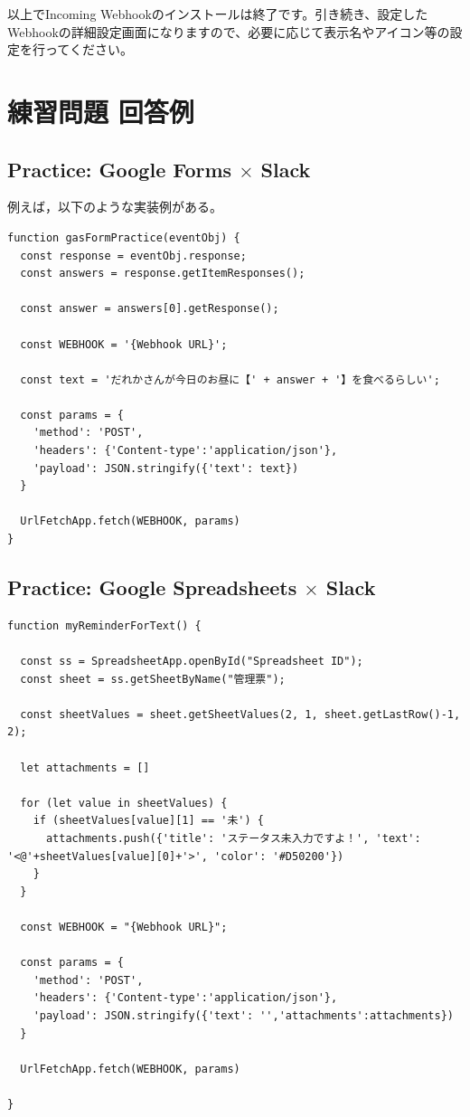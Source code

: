 \documentclass[uplatex,a4j]{jsarticle}
\begin{document}
以上でIncoming Webhookのインストールは終了です。引き続き、設定したWebhookの詳細設定画面になりますので、必要に応じて表示名やアイコン等の設定を行ってください。

\section{練習問題 回答例}

\subsection{Practice: Google Forms $\times$ Slack}

例えば，以下のような実装例がある。

\begin{lstlisting}[basicstyle=\ttfamily\footnotesize,frame=single,caption=Script Example for Forms practice]
function gasFormPractice(eventObj) {
  const response = eventObj.response;
  const answers = response.getItemResponses();
  
  const answer = answers[0].getResponse();
  
  const WEBHOOK = '{Webhook URL}';
  
  const text = 'だれかさんが今日のお昼に【' + answer + '】を食べるらしい';
  
  const params = {
    'method': 'POST',
    'headers': {'Content-type':'application/json'},
    'payload': JSON.stringify({'text': text})
  }
  
  UrlFetchApp.fetch(WEBHOOK, params)
}
\end{lstlisting}

\subsection{Practice: Google Spreadsheets $\times$ Slack}


\begin{lstlisting}[basicstyle=\ttfamily\footnotesize,frame=single,caption=Script Example for Spreadsheets practice]
function myReminderForText() {
  
  const ss = SpreadsheetApp.openById("Spreadsheet ID");
  const sheet = ss.getSheetByName("管理票");
  
  const sheetValues = sheet.getSheetValues(2, 1, sheet.getLastRow()-1, 2);
  
  let attachments = []
  
  for (let value in sheetValues) {
    if (sheetValues[value][1] == '未') {
      attachments.push({'title': 'ステータス未入力ですよ！', 'text': '<@'+sheetValues[value][0]+'>', 'color': '#D50200'})
    }
  }
  
  const WEBHOOK = "{Webhook URL}";
  
  const params = {
    'method': 'POST',
    'headers': {'Content-type':'application/json'},
    'payload': JSON.stringify({'text': '','attachments':attachments})
  }
  
  UrlFetchApp.fetch(WEBHOOK, params)

}
\end{lstlisting}
\end{document}

